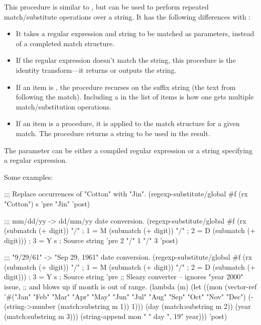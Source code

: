 \begin{desc}
This procedure is similar to , 
but can be used to perform repeated match/substitute operations over
a string.
It has the following differences with :
\begin{itemize}
  \item It takes a regular expression and string to be matched as
        parameters, instead of a completed match structure.
  \item If the regular expression doesn't match the string, this
        procedure is the identity transform---it returns or outputs the
        string.
  \item If an item is , the procedure recurses on the suffix string
        (the text from  following the match). 
        Including a  in the list of items is how one gets multiple 
        match/substitution operations.
  \item If an item is a procedure, it is applied to the match structure for
        a given match.
        The procedure returns a string to be used in the result.
  \end{itemize}
The  parameter can be either a compiled regular expression or
a string specifying a regular expression.

Some examples:
{\small
\begin{widecode}
;;; Replace occurrences of "Cotton" with "Jin".
(regexp-substitute/global #f (rx "Cotton") s
                          'pre "Jin" 'post)

;;; mm/dd/yy -> dd/mm/yy date conversion.
(regexp-substitute/global #f (rx (submatch (+ digit)) "/" ; 1 = M
                                 (submatch (+ digit)) "/" ; 2 = D
                                 (submatch (+ digit)))    ; 3 = Y
                          s ; Source string
                          'pre 2 "/" 1 "/" 3 'post)

;;; "9/29/61" -> "Sep 29, 1961" date conversion.
(regexp-substitute/global #f (rx (submatch (+ digit)) "/" ; 1 = M
                                 (submatch (+ digit)) "/" ; 2 = D
                                 (submatch (+ digit)))    ; 3 = Y
                          s ; Source string
      'pre 
      ;; Sleazy converter -- ignores "year 2000" issue, 
      ;; and blows up if month is out of range.
      (lambda (m)
        (let ((mon (vector-ref '#("Jan" "Feb" "Mar" "Apr" "May" "Jun"
                                  "Jul" "Aug" "Sep" "Oct" "Nov" "Dec")
                               (- (string->number (match:substring m 1)) 1)))
              (day (match:substring m 2))
              (year (match:substring m 3)))
          (string-append mon " " day ", 19" year)))
      'post)


\end{widecode}}
\end{desc}
